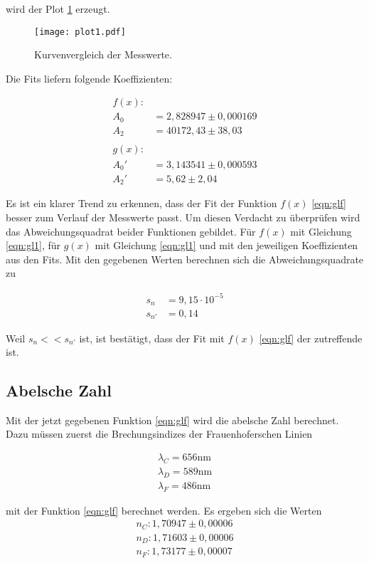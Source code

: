 wird der Plot \ref{fig:plot1} erzeugt.

\begin{figure}
  \centering
  \texttt{[image: plot1.pdf]}
  \caption{Kurvenvergleich der Messwerte.}
  \label{fig:plot1}
\end{figure}
\FloatBarrier

Die Fits liefern folgende Koeffizienten:

\begin{align*}
  f(x): \\
  A_0 &= 2,828947 \pm 0,000169 \\
  A_2 &= 40172,43 \pm 38,03 \\
  \\
  g(x): \\
  A_0' &= 3,143541 \pm 0,000593 \\
  A_2' &= 5,62 \pm 2,04 
\end{align*}

Es ist ein klarer Trend zu erkennen, dass der Fit der Funktion $f(x)$ \ref{eqn:glf} besser zum Verlauf der Messwerte passt.
Um diesen Verdacht zu überprüfen wird das Abweichungsquadrat beider Funktionen gebildet.
Für $f(x)$ mit Gleichung \ref{eqn:gl1}, für $g(x)$ mit Gleichung \ref{eqn:gl1} und mit den jeweiligen Koeffizienten aus den Fits.
Mit den gegebenen Werten berechnen sich die Abweichungsquadrate zu

\begin{align*}
  s_{n} &= 9,15 \cdot 10^{-5} \\
  s_{n'} &= 0,14
\end{align*}

Weil $s_n << s_{n'}$ ist, ist bestätigt, dass der Fit mit $f(x)$ \ref{eqn:glf} der zutreffende ist.

\subsection{Abelsche Zahl}

Mit der jetzt gegebenen Funktion \ref{eqn:glf} wird die abelsche Zahl berechnet.
Dazu müssen zuerst die Brechungsindizes der Frauenhoferschen Linien

\begin{align*}
  \lambda_C = 656 \text{nm} \\
  \lambda_D = 589 \text{nm} \\
  \lambda_F = 486 \text{nm}
\end{align*}

mit der Funktion \ref{eqn:glf} berechnet werden.
Es ergeben sich die Werten
\begin{align*}
  n_C:  1,70947 \pm 0,00006 \\
  n_D:  1,71603 \pm 0,00006 \\
  n_F:  1,73177 \pm 0,00007
\end{align*}

